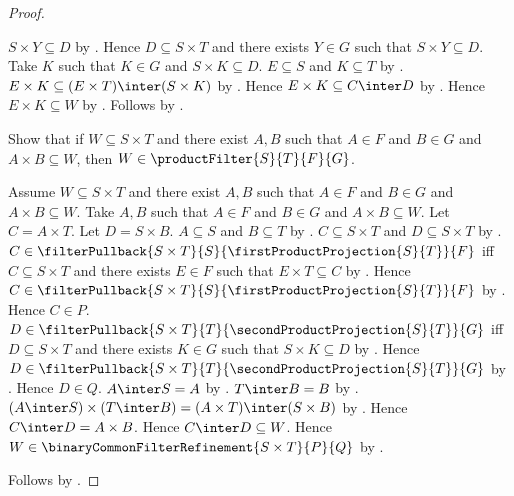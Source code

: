 \begin{proof}
\begin{subproof}
            $S\times Y\subseteq D$ by
            .
        Hence $D\subseteq S\times T$ and there exists $Y\in G$ such that
            $S\times Y\subseteq D$.
        Take $K$ such that $K\in G$ and $S\times K\subseteq D$.
        $E\subseteq S$ and $K\subseteq T$ by .
        $E\times K\subseteq(E\times T)\inter(S\times K)$ by
            .
        Hence $E\times K\subseteq C\inter D$ by
            .
        Hence $E\times K\subseteq W$ by .
        Follows by \auto.
    \end{subproof}
    Show that if $W\subseteq S\times T$ and there exist $A,B$ such that
        $A\in F$ and $B\in G$ and $A\times B\subseteq W$, then
        $W\in\productFilter{S}{T}{F}{G}$.
    \begin{subproof}
        Assume $W\subseteq S\times T$ and there exist $A,B$ such that
            $A\in F$ and $B\in G$ and $A\times B\subseteq W$.
        Take $A,B$ such that $A\in F$ and $B\in G$ and
            $A\times B\subseteq W$.
        Let $C=A\times T$.
        Let $D=S\times B$.
        $A\subseteq S$ and $B\subseteq T$ by .
        $C\subseteq S\times T$ and $D\subseteq S\times T$ by
            .
        $C\in\filterPullback{S\times T}{S}{
            \firstProductProjection{S}{T}}{F}$ iff
            $C\subseteq S\times T$ and there exists $E\in F$ such that
            $E\times T\subseteq C$ by
            .
        Hence $C\in\filterPullback{S\times T}{S}{
            \firstProductProjection{S}{T}}{F}$ by
            .
        Hence $C\in P$.
        $D\in\filterPullback{S\times T}{T}{
            \secondProductProjection{S}{T}}{G}$ iff
            $D\subseteq S\times T$ and there exists $K\in G$ such that
            $S\times K\subseteq D$ by
            .
        Hence $D\in\filterPullback{S\times T}{T}{
            \secondProductProjection{S}{T}}{G}$ by
            .
        Hence $D\in Q$.
        $A\inter S=A$ by .
        $T\inter B=B$ by .
        $(A\inter S)\times(T\inter B)
            =(A\times T)\inter(S\times B)$ by .
        Hence $C\inter D=A\times B$.
        Hence $C\inter D\subseteq W$.
        Hence $W\in\binaryCommonFilterRefinement{S\times T}{P}{Q}$ by
            \auto.
    \end{subproof}
    Follows by \auto.
\end{proof}

